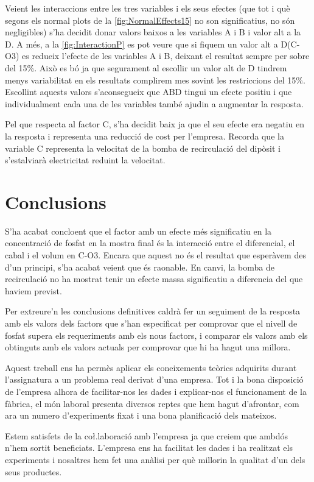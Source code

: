 \documentclass[a4paper]{article}
\begin{document}
Veient les interaccions entre les tres variables i els seus efectes (que tot i què segons els normal plots de la \autoref{fig:NormalEffects15} no son significatius, no són negligibles) s’ha decidit donar valors baixos a les variables A i B i valor alt a la D. A més, a la \autoref{fig:InteractionP} es pot veure que si fiquem un valor alt a D(C-O3) es redueix l'efecte de les variables A i B, deixant el resultat sempre per sobre del 15\%. Això es bó ja que segurament al escollir un valor alt de D tindrem menys variabilitat en els resultats 	complirem mes sovint les restriccions del 15\%. Escollint aquests valors s’aconsegueix que ABD tingui un efecte positiu i que individualment cada una de les variables també ajudin a augmentar la resposta.

Pel que respecta al factor C, s’ha decidit baix ja que el seu efecte era negatiu en la resposta i representa una reducció de cost per l’empresa. Recorda que la variable C representa la velocitat de la bomba de recirculació del dipòsit i s’estalviarà electricitat reduint la velocitat. 

\section{Conclusions}
S'ha acabat concloent que el factor amb un efecte més significatiu en la concentració de fosfat en la mostra final és la interacció entre el diferencial, el cabal i el volum en C-O3. Encara que aquest no és el resultat que esperàvem des d’un principi, s’ha acabat veient que és raonable. En canvi, la bomba de recirculació no ha mostrat tenir un efecte massa significatiu a diferencia del que haviem previst.

Per extreure'n les conclusions definitives caldrà fer un seguiment de la resposta amb els valors dels factors que s'han especificat per comprovar que el nivell de fosfat supera els requeriments amb els nous factors, i comparar els valors amb els obtinguts amb els valors actuals per comprovar que hi ha hagut una millora.

Aquest treball ens ha permès aplicar els coneixements teòrics adquirits durant l’assignatura a un problema real derivat d’una empresa.
Tot i la bona disposició de l’empresa alhora de facilitar-nos les dades i explicar-nos el funcionament de la fàbrica, el món laboral presenta diversos reptes que hem hagut d’afrontar, com ara un numero d’experiments fixat i una bona planificació dels mateixos.

Estem satisfets de la co\l.laboració amb l’empresa ja que creiem que ambdós n’hem sortit beneficiats. L’empresa ens ha facilitat les dades i ha realitzat els experiments i nosaltres hem fet una anàlisi per què millorin la qualitat d’un dels seus productes.
\end{document}
